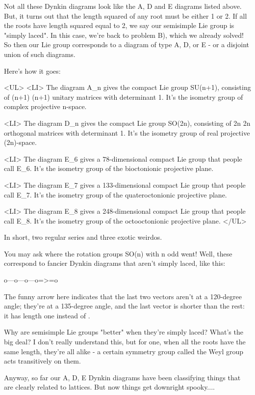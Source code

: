 Not all these Dynkin diagrams look like the A, D and E diagrams listed
above.  But, it turns out that the length squared of any root must be 
either 1 or 2.  If all the roots have length squared equal to 2, we
say our semisimple Lie group is "simply laced".  In this case, we're
back to problem B), which we already solved!  So then our Lie group 
corresponds to a diagram of type A, D, or E - or a disjoint union of 
such diagrams.

Here's how it goes:

<UL>
<LI>
 The diagram A_{n} gives the compact Lie group SU(n+1), 
  consisting of (n+1) \times  (n+1) unitary matrices with determinant 1.  
  It's the isometry group of complex projective n-space.

<LI>
 The diagram D_{n} gives the compact Lie group SO(2n), 
  consisting of 2n \times  2n orthogonal matrices with determinant 1.
  It's the isometry group of real projective (2n)-space.

<LI>
 The diagram E_{6} gives a 78-dimensional compact Lie group
  that people call E_{6}.  It's the isometry group of the bioctonionic
  projective plane.

<LI>
 The diagram E_{7} gives a 133-dimensional compact Lie group
  that people call E_{7}.  It's the isometry group of the quateroctonionic
  projective plane.

<LI>
 The diagram E_{8} gives a 248-dimensional compact Lie group
  that people call E_{8}.  It's the isometry group of the octooctonionic 
  projective plane.
</UL>

In short, two regular series and three exotic weirdos.  

You may ask where the rotation groups SO(n) with n odd went!  
Well, these correspond to fancier Dynkin diagrams that aren't
simply laced, like this:

 o---o---o---o=>=o

The funny arrow here indicates that the last two vectors aren't 
at a 120-degree angle; they're at a 135-degree angle, and the last
vector is shorter than the rest: it has length one instead of .

Why are semisimple Lie groups "better" when they're simply laced?
What's the big deal?  I don't really understand this, but for one,
when all the roots have the same length, they're all alike - 
a certain symmetry group called the Weyl group acts transitively on them.  

Anyway, so far our A, D, E Dynkin diagrams have been classifying
things that are clearly related to lattices.  But now things get
downright spooky....


